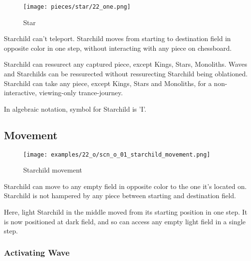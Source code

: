 \noindent
\begin{wrapfigure}[11]{l}{0.4\textwidth}
\centering
\texttt{[image: pieces/star/22\_one.png]}
\caption{Star}
\label{fig:star/22_one}
\end{wrapfigure}
Starchild can't teleport. Starchild moves from starting to destination field in opposite
color in one step, without interacting with any piece on chessboard.

Starchild can ressurect any captured piece, except Kings, Stars, Monoliths. Waves and
Starchilds can be ressurected without ressurecting Starchild being oblationed.
Starchild can take any piece, except Kings, Stars and Monoliths, for a non-interactive,
viewing-only trance-journey.

In algebraic notation, symbol for Starchild is 'I'.

\clearpage %

\subsection*{Movement}

\vspace*{-1.1\baselineskip}
\noindent
\begin{figure}[!h]
\texttt{[image: examples/22\_o/scn\_o\_01\_starchild\_movement.png]}
\caption{Starchild movement}
\label{fig:scn_o_01_starchild_movement}
\end{figure}

Starchild can move to any empty field in opposite color to the one it's located on.
Starchild is not hampered by any piece between starting and destination field.

Here, light Starchild in the middle moved from its starting position in one step.
It is now positioned at dark field, and so can access any empty light field in a
single step.

\clearpage %

\subsubsection*{Activating Wave}

